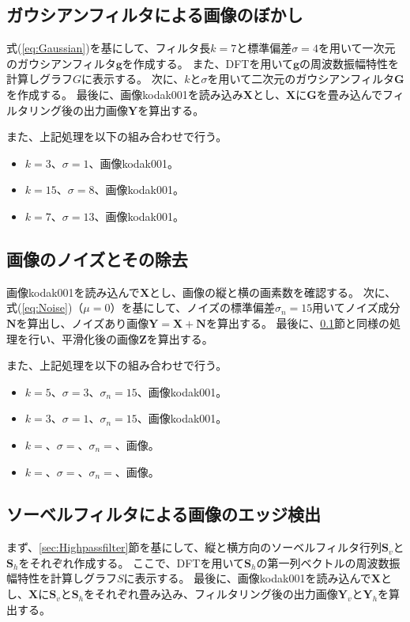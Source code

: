 \documentclass[11pt,a4paper]{jsarticle}
\begin{document}
\subsection{ガウシアンフィルタによる画像のぼかし}\label{sec:2-1}
式(\ref{eq:Gaussian})を基にして、フィルタ長$k=7$と標準偏差$\sigma=4$を用いて一次元のガウシアンフィルタ$\bm{g}$を作成する。
また、DFTを用いて$\bm{g}$の周波数振幅特性を計算しグラフ$G$に表示する。
次に、$k$と$\sigma$を用いて二次元のガウシアンフィルタ$\mathbf{G}$を作成する。
最後に、画像kodak001を読み込み$\mathbf{X}$とし、$\mathbf{X}$に$\mathbf{G}$を畳み込んでフィルタリング後の出力画像$\mathbf{Y}$を算出する。

また、上記処理を以下の組み合わせで行う。
\begin{itemize}
	\item $k=3$、$\sigma=1$、画像kodak001。
	\item $k=15$、$\sigma=8$、画像kodak001。
	\item $k=7$、$\sigma=13$、画像kodak001。
\end{itemize}


\subsection{画像のノイズとその除去}\label{sec:2-2}
画像kodak001を読み込んで$\mathbf{X}$とし、画像の縦と横の画素数を確認する。
次に、式(\ref{eq:Noise})（$\mu=0$）を基にして、ノイズの標準偏差$\sigma _n=15$用いてノイズ成分$\mathbf N$を算出し、ノイズあり画像$\mathbf{Y}=\mathbf{X}+\mathbf{N}$を算出する。
最後に、\ref{sec:2-1}節と同様の処理を行い、平滑化後の画像$\mathbf{Z}$を算出する。

また、上記処理を以下の組み合わせで行う。
\begin{itemize}
	\item $k=5$、$\sigma=3$、$\sigma_n=15$、画像kodak001。
	\item $k=3$、$\sigma=1$、$\sigma_n=15$、画像kodak001。
	\item $k=$、$\sigma=$、$\sigma_n=$、画像。
	\item $k=$、$\sigma=$、$\sigma_n=$、画像。
\end{itemize}


\subsection{ソーベルフィルタによる画像のエッジ検出}\label{sec:2-3}
まず、\ref{sec:Highpassfilter}節を基にして、縦と横方向のソーベルフィルタ行列$\mathbf{S}_v$と$\mathbf{S}_h$をそれぞれ作成する。
ここで、DFTを用いて$\mathbf{S}_h$の第一列ベクトルの周波数振幅特性を計算しグラフ$S$に表示する。
最後に、画像kodak001を読み込んで$\mathbf{X}$とし、$\mathbf{X}$に$\mathbf{S}_v$と$\mathbf{S}_h$をそれぞれ畳み込み、フィルタリング後の出力画像$\mathbf{Y}_v$と$\mathbf{Y}_h$を算出する。
\end{document}
